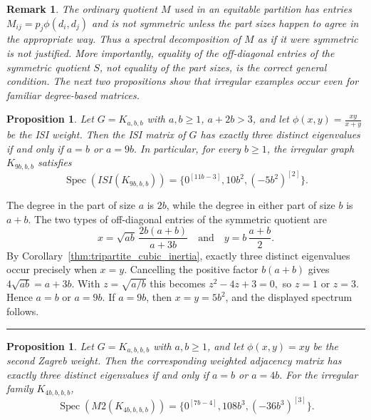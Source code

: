 \documentclass[12pt,twoside]{article}
\renewenvironment{proof}{{\noindent\bfseries Proof.}}{\qed}
\newcommand{\spec}{\operatorname{Spec}}
\newtheorem{remark}[theorem]{Remark}
\newtheorem{proposition}[theorem]{Proposition}
\def\qed{\nolinebreak\hfill\rule{.2cm}{.2cm}\par\addvspace{.5cm}}
\begin{document}
\begin{remark}\label{rem:correction_three_eigs}
	The ordinary quotient $M$ used in an equitable partition has entries $M_{ij}=p_j\phi(d_i,d_j)$ and is not symmetric unless the part sizes happen to agree in the appropriate way. Thus a spectral decomposition of $M$ as if it were symmetric is not justified. More importantly, equality of the off-diagonal entries of the symmetric quotient $S$, not equality of the part sizes, is the correct general condition. The next two propositions show that irregular examples occur even for familiar degree-based matrices.
\end{remark}

\begin{proposition}\label{prop:isi_9bb}
	Let $G=K_{a,b,b}$ with $a,b\ge 1$, $a+2b>3$, and let
	$
	\phi(x,y)=\frac{xy}{x+y}
	$
	be the ISI weight. Then the ISI matrix of $G$ has exactly three distinct eigenvalues if and only if
	$
	a=b$ or $a=9b.
	$
	In particular, for every $b\ge 1$, the irregular graph $K_{9b,b,b}$ satisfies
	$$
	\spec(ISI(K_{9b,b,b}))
	=\{0^{[11b-3]},10b^2,(-5b^2)^{[2]}\}.
	$$
\end{proposition}

\begin{proof}
	The degree in the part of size $a$ is $2b$, while the degree in either part of size $b$ is $a+b$. The two types of off-diagonal entries of the symmetric quotient are
	$$
	x=\sqrt{ab}\,\frac{2b(a+b)}{a+3b}
	\quad 
	\text{and}
	\quad
	y=b\,\frac{a+b}{2}.
	$$
	By Corollary~\ref{thm:tripartite_cubic_inertia}, exactly three distinct eigenvalues occur precisely when $x=y$. Cancelling the positive factor $b(a+b)$ gives
	$
	4\sqrt{ab}=a+3b.
	$
	With $z=\sqrt{a/b}$ this becomes
	$
	z^2-4z+3=0,
	$
	so $z=1$ or $z=3$. Hence $a=b$ or $a=9b$. If $a=9b$, then $x=y=5b^2$, and the displayed spectrum follows.
\end{proof}

\begin{proposition}\label{prop:m2_4bbb}
	Let $G=K_{a,b,b,b}$ with $a,b\ge 1$, and let $\phi(x,y)=xy$ be the second Zagreb weight. Then the corresponding weighted adjacency matrix has exactly three distinct eigenvalues if and only if
	$
	a=b$ or $a=4b.
	$
	For the irregular family $K_{4b,b,b,b}$,
	$$
	\spec(M2(K_{4b,b,b,b}))
	=\{0^{[7b-4]},108b^3,(-36b^3)^{[3]}\}.
	$$
\end{proposition}
\end{document}
